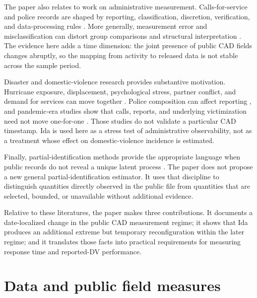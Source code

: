 \documentclass[11pt]{article}
\begin{document}
The paper also relates to work on administrative measurement. Calls-for-service and police records are shaped by reporting, classification, discretion, verification, and data-processing rules \citep{KlingerBridges1997,BoivinCordeau2011,BoivinOuellet2014,SimpsonOrosco2021}. More generally, measurement error and misclassification can distort group comparisons and structural interpretation \citep{KapteynYpma2007,ChenHongNekipelov2011,KnoxLoweMummolo2020}. The evidence here adds a time dimension: the joint presence of public CAD fields changes abruptly, so the mapping from activity to released data is not stable across the sample period.

Disaster and domestic-violence research provides substantive motivation. Hurricane exposure, displacement, psychological stress, partner conflict, and demand for services can move together \citep{AnastarioShehabLawry2009,SchumacherEtAl2010,HarvilleTaylorTesfai2011,FirstEtAl2022}. Police composition can affect reporting \citep{MillerSegal2019}, and pandemic-era studies show that calls, reports, and underlying victimization need not move one-for-one \citep{LeslieWilson2020,BullingerCarrPackham2021,MillerSegalSpencer2022,MillerSegalSpencer2024}. Those studies do not validate a particular CAD timestamp. Ida is used here as a stress test of administrative observability, not as a treatment whose effect on domestic-violence incidence is estimated.

Finally, partial-identification methods provide the appropriate language when public records do not reveal a unique latent process \citep{Manski1989,Manski1990,Manski2003,Tamer2010,Molinari2020}. The paper does not propose a new general partial-identification estimator. It uses that discipline to distinguish quantities directly observed in the public file from quantities that are selected, bounded, or unavailable without additional evidence.

Relative to these literatures, the paper makes three contributions. It documents a date-localized change in the public CAD measurement regime; it shows that Ida produces an additional extreme but temporary reconfiguration within the later regime; and it translates those facts into practical requirements for measuring response time and reported-DV performance.

\section{Data and public field measures}
\end{document}
